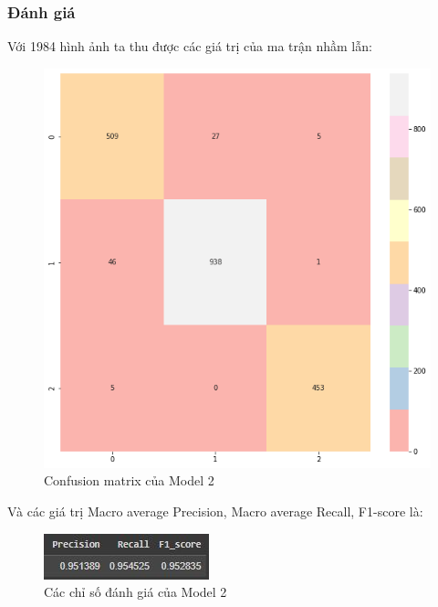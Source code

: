 \subsubsection{Đánh giá}
Với 1984 hình ảnh ta thu được các giá trị của ma trận nhầm lẫn:
\begin{center}
    \begin{figure}[!h]
        \centering
        \includegraphics[scale = 0.4]{fileanh/15.png}
        \caption{Confusion matrix của Model 2}
    \end{figure}
\end{center}
Và các giá trị Macro average Precision, Macro average Recall, F1-score là:
\begin{center}
    \begin{figure}[!h]
        \centering
        \includegraphics[scale = 2.5]{fileanh/16.jpg}
        \caption{Các chỉ số đánh giá của Model 2}
    \end{figure}
\end{center}

